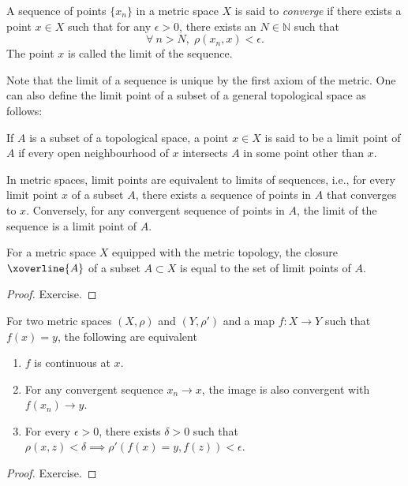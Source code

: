 \begin{defn}
A sequence of points $\{x_n\}$ in a metric space $X$ is said to \emph{converge} if there exists a point $x\in X$ such that for any $\epsilon >0$, there exists an $N\in \mathbb{N}$ such that
\begin{equation}
    \forall ~ n>N,\; \rho(x_n,x) < \epsilon.
\end{equation}
The point $x$ is called the limit of the sequence.
\end{defn}
Note that the limit of a sequence is unique by the first axiom of the metric. One can also define the limit point of a subset of a general topological space as follows:
\begin{defn}
If $A$ is a subset of a topological space, a point $x\in X$ is said to be a limit point of $A$ if every open neighbourhood of $x$ intersects $A$ in some point other than $x$.
\end{defn}

In metric spaces, limit points are equivalent to limits of sequences, i.e., for every limit point $x$ of a subset $A$, there exists a sequence of points in $A$ that converges to $x$. Conversely, for any convergent sequence of points in $A$, the limit of the sequence is a limit point of $A$.

\begin{prop}
For a metric space $X$ equipped with the metric topology, the closure $\xoverline{A}$ of a subset $A\subset X$ is equal to the set of limit points of $A$.
\end{prop}
\begin{proof}
Exercise.
\end{proof}

\begin{prop}
For two metric spaces $(X,\rho)$ and $(Y,\rho')$ and a map $f:X\rightarrow Y$ such that $f(x)=y$, the following are equivalent
\begin{enumerate}
    \item $f$ is continuous at $x$.
    \item For any convergent sequence $x_n\rightarrow x$, the image is also convergent with $f(x_n)\rightarrow y$.
    \item For every $\epsilon>0$, there exists $\delta>0$ such that $\rho(x,z)<\delta \implies \rho'(f(x)=y, f(z))<\epsilon$.
\end{enumerate}
\end{prop}
\begin{proof}
Exercise.
\end{proof}

